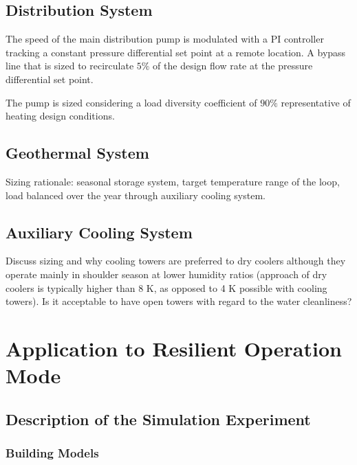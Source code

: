 \subsection{Distribution System}

The speed of the main distribution pump is modulated with a PI controller tracking a constant pressure differential set point at a remote location. A bypass line that is sized to recirculate $5\%$ of the design flow rate at the pressure differential set point.

The pump is sized considering a load diversity coefficient of $90\%$ representative of heating design conditions.

\subsection{Geothermal System}

Sizing rationale: seasonal storage system, target temperature range of the loop, load balanced over the year through auxiliary cooling system.


\subsection{Auxiliary Cooling System}

Discuss sizing and why cooling towers are preferred to dry coolers although they operate mainly in shoulder season at lower humidity ratios (approach of dry coolers is typically higher than 8 K, as opposed to 4 K possible with cooling towers). Is it acceptable to have open towers with regard to the water cleanliness?



\section{Application to Resilient Operation Mode} \label{sec:application}



\subsection{Description of the Simulation Experiment} \label{sec:experiment}

\subsubsection{Building Models} \label{sec:buildings}



